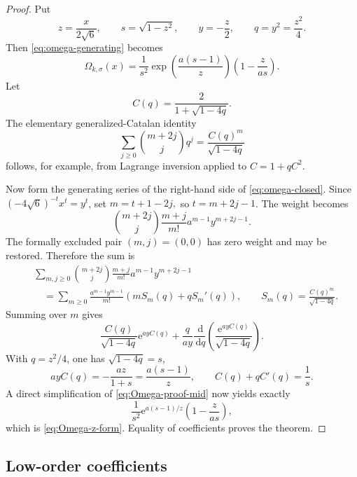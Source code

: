 \documentclass[11pt]{article}
\numberwithin{equation}{section}
\theoremstyle{mainthm}
\theoremstyle{defstyle}
\theoremstyle{remark}
\newcommand{\e}{\mathrm e}
\newcommand{\dd}{\,\mathrm d}
\begin{document}
\begin{proof}
Put
\[
 z=\frac{x}{2\sqrt6},\qquad
 s=\sqrt{1-z^2},\qquad
 y=-\frac z2,
 \qquad q=y^2=\frac{z^2}{4}.
\]
Then \eqref{eq:omega-generating} becomes
\begin{equation}\label{eq:Omega-z-form}
 \Omega_{k,\sigma}(x)
 =\frac1{s^2}\exp\!\left(\frac{a(s-1)}z\right)
 \left(1-\frac{z}{as}\right).
\end{equation}
Let
\begin{equation}\label{eq:Catalan-C}
 C(q)=\frac{2}{1+\sqrt{1-4q}}.
\end{equation}
The elementary generalized-Catalan identity
\begin{equation}\label{eq:binomial-Catalan-identity}
 \sum_{j\ge0}\binom{m+2j}{j}q^j
 =\frac{C(q)^m}{\sqrt{1-4q}}
\end{equation}
follows, for example, from Lagrange inversion applied to \(C=1+qC^2\).

Now form the generating series of the right-hand side of \eqref{eq:omega-closed}.  Since \((-4\sqrt6)^{-t}x^t=y^t\), set
\(
 m=t+1-2j,
\)
so \(t=m+2j-1\).  The weight becomes
\[
 \binom{m+2j}{j}\frac{m+j}{m!}a^{m-1}y^{m+2j-1}.
\]
The formally excluded pair \((m,j)=(0,0)\) has zero weight and may be restored.  Therefore the sum is
\begin{align*}
 &\sum_{m,j\ge0}
 \binom{m+2j}{j}\frac{m+j}{m!}a^{m-1}y^{m+2j-1}\\
 &\quad=\sum_{m\ge0}\frac{a^{m-1}y^{m-1}}{m!}
 \left(mS_m(q)+qS_m'(q)\right),
 \qquad
 S_m(q)=\frac{C(q)^m}{\sqrt{1-4q}}.
\end{align*}
Summing over \(m\) gives
\begin{equation}\label{eq:Omega-proof-mid}
 \frac{C(q)}{\sqrt{1-4q}}\e^{ayC(q)}
 +\frac{q}{ay}\frac{\dd}{\dd q}
 \left(\frac{\e^{ayC(q)}}{\sqrt{1-4q}}\right).
\end{equation}
With \(q=z^2/4\), one has \(\sqrt{1-4q}=s\),
\[
 ayC(q)=-\frac{az}{1+s}=\frac{a(s-1)}z,
 \qquad
 C(q)+qC'(q)=\frac1s.
\]
A direct simplification of \eqref{eq:Omega-proof-mid} now yields exactly
\[
 \frac1{s^2}\e^{a(s-1)/z}\left(1-\frac{z}{as}\right),
\]
which is \eqref{eq:Omega-z-form}.  Equality of coefficients proves the theorem.
\end{proof}

\subsection{Low-order coefficients}
\end{document}
